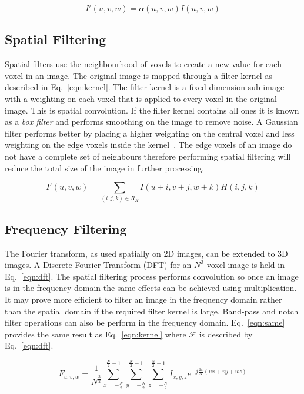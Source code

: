 \documentclass[journal]{IEEEtran}
\begin{document}
\begin{equation}
	I'(u,v,w) = \alpha(u,v,w)I(u,v,w)
	\label{eqn:point} 
\end{equation}



\subsection{Spatial Filtering}
\label{sec:spatial}
Spatial filters use the neighbourhood of voxels to create a new value for each voxel in an image. 
The original image is mapped through a filter kernel as described in Eq.~\eqref{eqn:kernel}.
The filter kernel is a fixed dimension sub-image with a weighting on each voxel that is applied to every voxel in the original image.
This is spatial convolution.
If the filter kernel contains all ones it is known as a \emph{box filter} and performs smoothing on the image to remove noise.
A Gaussian filter performs better by placing a higher weighting on the central voxel and less weighting on the edge voxels inside the kernel~\cite{lohmann1998volumetric}.
The edge voxels of an image do not have a complete set of neighbours therefore performing spatial filtering will reduce the total size of the image in further processing.

\begin{equation}
	I'(u,v,w) = \sum\limits_{(i,j,k) \in R_H} I(u + i,v + j, w + k)H(i,j,k)
	\label{eqn:kernel} 
\end{equation}



\subsection{Frequency Filtering}
The Fourier transform, as used spatially on 2D images, can be extended to 3D images.
A Discrete Fourier Transform (DFT) for an $N^3$ voxel image is held in Eq.~\eqref{eqn:dft}.
The spatial filtering process performs convolution so once an image is in the frequency domain the same effects can be achieved using multiplication.
It may prove more efficient to filter an image in the frequency domain rather than the spatial domain if the required filter kernel is large.
Band-pass and notch filter operations can also be perform in the frequency domain.
Eq.~\eqref{eqn:same} provides the same result as Eq.~\eqref{eqn:kernel} where $\mathcal{F}$ is described by Eq.~\eqref{eqn:dft}.

\begin{equation}
	F_{u,v,w} = \frac{1}{N^{\frac{3}{2}}} \sum\limits_{x=-\frac{N}{2}}^{\frac{N}{2}-1}\sum\limits_{y=-\frac{N}{2}}^{\frac{N}{2}-1}\sum\limits_{z=-\frac{N}{2}}^{\frac{N}{2}-1}I_{x,y,z}e^{-j\frac{2\pi}{N}(ux + vy + wz)}
	\label{eqn:dft} 
\end{equation}
\end{document}
